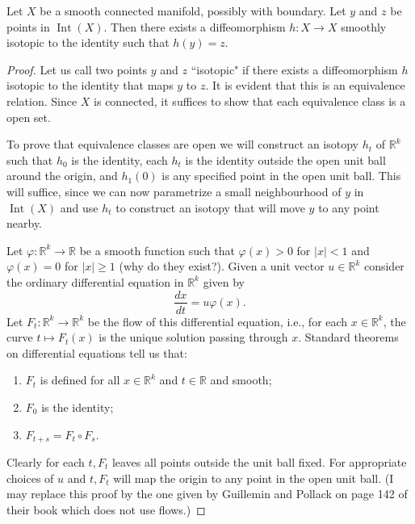 \begin{lemma}
    Let $X$ be a smooth connected manifold, possibly with boundary. Let $y$ and $z$ be points in $\operatorname{Int}(X)$. Then there exists a diffeomorphism $h: X \rightarrow X$ smoothly isotopic to the identity such that $h(y)=z$. 
\end{lemma}
\begin{proof}
    Let us call two points $y$ and $z$ ``isotopic" if there exists a diffeomorphism $h$ isotopic to the identity that maps $y$ to $z$. It is evident that this is an equivalence relation. Since $X$ is connected, it suffices to show that each equivalence class is a open set.

To prove that equivalence classes are open we will construct an isotopy $h_{t}$ of $\mathbb{R}^{k}$ such that $h_{0}$ is the identity, each $h_{t}$ is the identity outside the open unit ball around the origin, and $h_{1}(0)$ is any specified point in the open unit ball. This will suffice, since we can now parametrize a small neighbourhood of $y$ in $\operatorname{Int}(X)$ and use $h_{t}$ to construct an isotopy that will move $y$ to any point nearby.

Let $\varphi: \mathbb{R}^{k} \rightarrow \mathbb{R}$ be a smooth function such that $\varphi(x)>0$ for $|x|<1$ and $\varphi(x)=0$ for $|x| \geq 1$ (why do they exist?). Given a unit vector $u \in \mathbb{R}^{k}$ consider the ordinary differential equation in $\mathbb{R}^{k}$ given by
$$
\frac{d x}{d t}=u \varphi(x).
$$
Let $F_{t}: \mathbb{R}^{k} \rightarrow \mathbb{R}^{k}$ be the flow of this differential equation, i.e., for each $x \in \mathbb{R}^{k}$, the curve $t \mapsto F_{t}(x)$ is the unique solution passing through $x$. Standard theorems on differential equations tell us that:
\begin{enumerate}
    \item $F_{t}$ is defined for all $x \in \mathbb{R}^{k}$ and $t \in \mathbb{R}$ and smooth;
    \item $F_{0}$ is the identity;
    \item $F_{t+s}=F_{t} \circ F_{s}$.
\end{enumerate}

Clearly for each $t, F_{t}$ leaves all points outside the unit ball fixed. For appropriate choices of $u$ and $t, F_{t}$ will map the origin to any point in the open unit ball.
(I may replace this proof by the one given by Guillemin and Pollack on page 142 of their book which does not use flows.)
\end{proof}

